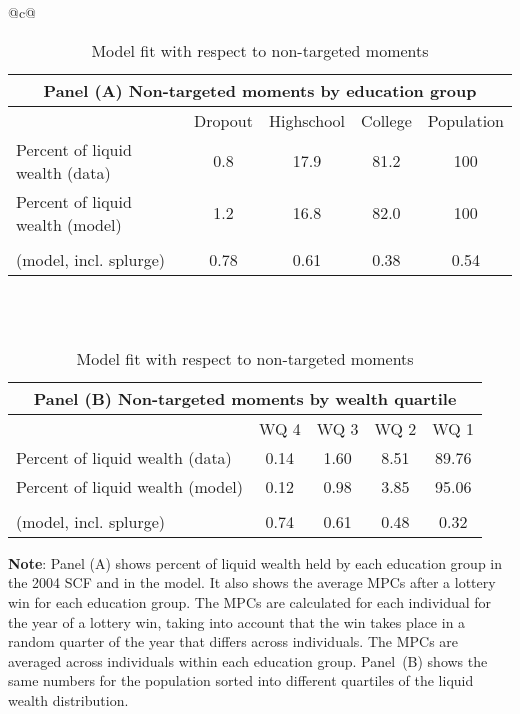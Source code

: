 \documentclass[\econtexRoot/HAFiscal]{subfiles}
\begin{document}
\begin{table}[th]
    \centering
    \begin{tabular*}{\textwidth}{@{\extracolsep{\fill}}c@{}}
        \begin{tabular}{lcccc}
            \multicolumn{5}{c}{Panel (A) Non-targeted moments by education group} \\ \midrule
            & Dropout & Highschool & College & Population \\ \midrule
            Percent of liquid wealth (data) & 0.8 & 17.9 & 81.2 & 100 \\
            Percent of liquid wealth (model) & 1.2 & 16.8 & 82.0 & 100 \\
            \makecell[l]{Avg. lottery-win-year MPC \\ (model, incl. splurge)} & 0.78 & 0.61 & 0.38 & 0.54
            \\ \bottomrule 
        \end{tabular} \\ \\

      \vspace{2em}
      
        \begin{tabular}{lcccc}
            \multicolumn{5}{c}{Panel (B) Non-targeted moments by wealth quartile} \\ \midrule
             & WQ 4 & WQ 3 & WQ 2 & WQ 1 \\ \midrule
            Percent of liquid wealth (data) & 0.14 & 1.60 & 8.51 & 89.76 \\
            Percent of liquid wealth (model) & 0.12 & 0.98 & 3.85 & 95.06 \\
            \makecell[l]{Avg. lottery-win-year MPC \\ (model, incl. splurge)} & 0.74 & 0.61 & 0.48 & 0.32
            \\ \bottomrule 
        \end{tabular}
    \end{tabular*}
    \caption{Model fit with respect to non-targeted moments}
    \notinsubfile{\label{tab:nonTargetedMoments}}
    \parbox{16cm}{\small \vspace{.15cm} \textbf{Note}: Panel (A) shows percent of liquid wealth held by each education group in the 2004 SCF and in the model.
It also shows the average MPCs after a lottery win for each education group.
The MPCs are calculated for each individual for the year of a lottery win, taking into account that the win takes place in a random quarter of the year that differs across individuals.
The MPCs are averaged across individuals within each education group.
Panel~(B) shows the same numbers for the population sorted into different quartiles of the liquid wealth distribution.\normalsize}
  \end{table}
  
\end{document}

